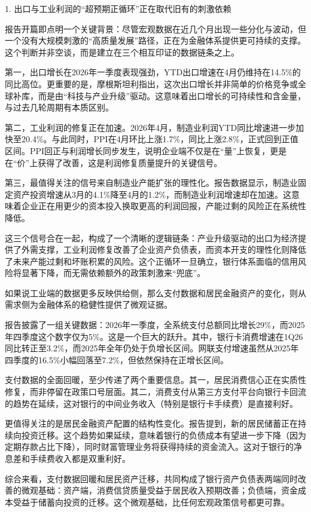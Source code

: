 \documentclass[11pt]{ctexart}
\begin{document}
1. 出口与工业利润的“超预期正循环”正在取代旧有的刺激依赖

报告开篇即点明一个关键背景：尽管宏观数据在近几个月出现一些分化与波动，但一个没有大规模刺激的“高质量发展”路径，正在为金融体系提供更可持续的支撑。这个判断并非空谈，而是建立在三个相互印证的数据链条之上。

第一，出口增长在2026年一季度表现强劲，YTD出口增速在4月仍维持在14.5\%的同比高位。更重要的是，摩根斯坦利指出，这次出口增长并非简单的价格竞争或全球补库，而是由“科技与产业升级”驱动。这意味着出口增长的可持续性和含金量，与过去几轮周期有本质区别。

第二，工业利润的修复正在加速。2026年4月，制造业利润YTD同比增速进一步加快至20.4\%。与此同时，PPI在4月环比上涨1.7\%，同比上涨2.8\%，正式回到正值区间。PPI回正与利润增长同步发生，说明企业端不仅是在“量”上恢复，更是在“价”上获得了改善，这是利润修复质量提升的关键信号。

第三，最值得关注的信号来自制造业产能扩张的理性化。报告数据显示，制造业固定资产投资增速从3月的4.1\%降至4月的1.2\%，而制造业利润增速却在加速。这意味着企业正在用更少的资本投入换取更高的利润回报，产能过剩的风险正在系统性降低。

这三个信号合在一起，构成了一个清晰的逻辑链条：产业升级驱动的出口为经济提供了外需支撑，工业利润修复改善了企业资产负债表，而资本开支的理性化则降低了未来产能过剩和坏账积累的风险。这个正循环一旦确立，银行体系面临的信用风险将显著下降，而无需依赖额外的政策刺激来“兜底”。

如果说工业端的数据更多反映供给侧，那么支付数据和居民金融资产的变化，则从需求侧为金融体系的稳健性提供了微观证据。

报告披露了一组关键数据：2026年一季度，全系统支付总额同比增长29\%，而2025年四季度这个数字仅为5\%。这是一个巨大的跃升。其中，银行卡消费增速在1Q26同比转正至3.2\%，而2025年全年仍处于负增长区间。网联支付增速虽然从2025年四季度的16.5\%小幅回落至7.2\%，但依然保持在正增长区间。

支付数据的全面回暖，至少传递了两个重要信息。其一，居民消费信心正在实质性修复，而非停留在政策口号层面。其二，消费支付从第三方支付平台向银行卡回流的趋势在延续，这对银行的中间业务收入（特别是银行卡手续费）是直接利好。

更值得关注的是居民金融资产配置的结构性变化。报告提到，新的居民储蓄正在持续向投资迁移。这个趋势如果延续，意味着银行的负债成本有望进一步下降（因为定期存款占比下降），同时财富管理业务将获得持续的资金流入。这对于银行的净息差和手续费收入都是双重利好。

综合来看，支付数据回暖和居民资产迁移，共同构成了银行资产负债表两端同时改善的微观基础：资产端，消费信贷质量受益于居民收入预期改善；负债端，资金成本受益于储蓄向投资的迁移。这个微观基础，比任何宏观政策信号都更可靠。
\end{document}

